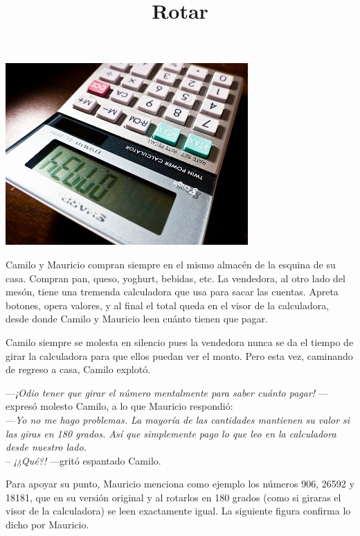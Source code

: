 \documentclass{oci}
\title{Rotar}
\begin{document}
\begin{problemDescription}

  \centerline{\includegraphics[scale=0.5]{upside-down.jpg}}


Camilo y Mauricio compran siempre en el mismo almacén de la esquina de su casa. %
Compran pan, queso, yoghurt, bebidas, etc. 
La vendedora, al otro lado del mesón, tiene una tremenda calculadora que usa para sacar las cuentas. 
Apreta botones, opera valores, y al final el total queda en el visor de la calculadora, 
desde donde Camilo y Mauricio leen cuánto tienen que pagar.

Camilo siempre se molesta en silencio pues la vendedora nunca se da el tiempo de girar la calculadora para que ellos puedan ver el monto.
Pero esta vez, caminando de regreso a casa, Camilo explotó.

---\emph{¡Odio tener que girar el número mentalmente para saber cuánto pagar!} ---expresó molesto Camilo, a lo que Mauricio respondió: \\
---\emph{Yo no me hago problemas. La mayoría de las cantidades mantienen su valor si las giras en 180 grados. Así que simplemente pago lo que leo en la calculadora desde nuestro lado.} \\
-- \emph{¡¿Qué?!} ---gritó espantado Camilo.

Para apoyar su punto, Mauricio menciona como ejemplo los números 906, 26592 y 18181, que en su versión original y al rotarlos en 180 grados (como si giraras el visor de la calculadora) se leen exactamente igual. La siguiente figura confirma lo dicho por Mauricio.

\bigskip
\bigskip

\begin{center}
\resizebox{!}{40pt}{} \hspace*{50pt}  
\resizebox{!}{40pt}{} \hspace*{50pt}  
\resizebox{!}{40pt}{}\bigskip


\end{center}
\end{problemDescription}
\end{document}
